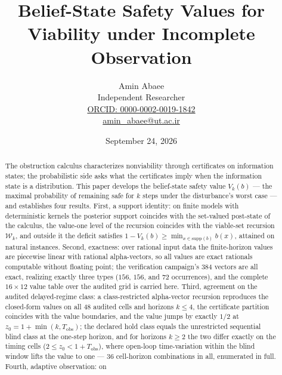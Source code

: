 \documentclass[10pt,twocolumn]{article}
\theoremstyle{plain}
\theoremstyle{definition}
\theoremstyle{remark}
\begin{document}
\title{Belief-State Safety Values for\\
Viability under Incomplete Observation}
\author{Amin Abaee\\[0.35em]
{\small Independent Researcher}\\[0.55em]
{\small\href{https://orcid.org/0000-0002-0019-1842}{ORCID: 0000-0002-0019-1842}}\\[0.3em]
{\small\href{mailto:amin\_abaee@ut.ac.ir}{amin\_abaee@ut.ac.ir}}}
\date{September 24, 2026}
\maketitle

\begin{abstract}
The obstruction calculus characterizes nonviability through certificates on
information states; the probabilistic side asks what the certificates imply
when the information state is a distribution. This paper develops the
belief-state safety value \(V_{k}(b)\) --- the maximal probability of
remaining safe for \(k\) steps under the disturbance's worst case --- and
establishes four results. First, a support identity: on finite models with
deterministic kernels the posterior support coincides with the set-valued
post-state of the calculus, the value-one level of the recursion coincides
with the viable-set recursion \(\mathcal{W}_{k}\), and outside it the
deficit satisfies \(1 - V_{k}(b) \ge \min_{x \in \mathrm{supp}(b)} b(x)\),
attained on natural instances. Second, exactness: over rational input data
the finite-horizon values are piecewise linear with rational alpha-vectors,
so all values are exact rationals computable without floating point; the
verification campaign's 384 vectors are all exact, realizing exactly three
types (\(156\), \(156\), and \(72\) occurrences), and the complete
\(16 \times 12\) value table over the audited grid is carried here. Third,
agreement on the audited delayed-regime class: a class-restricted
alpha-vector recursion reproduces the closed-form values on all 48 audited
cells and horizons \(k \le 4\), the certificate partition coincides with
the value boundaries, and the value jumps by exactly \(1/2\) at
\(z_{0} = 1 + \min(k, T_{\mathrm{obs}})\); the declared hold class equals
the unrestricted sequential blind class at the one-step horizon, and for
horizons \(k \ge 2\) the two differ exactly on the timing cells
(\(2 \le z_{0} < 1 + T_{\mathrm{obs}}\)), where open-loop time-variation
within the blind window lifts the value to one --- 36 cell-horizon
combinations in all, enumerated in full. Fourth, adaptive observation: on

\end{abstract}
\end{document}
